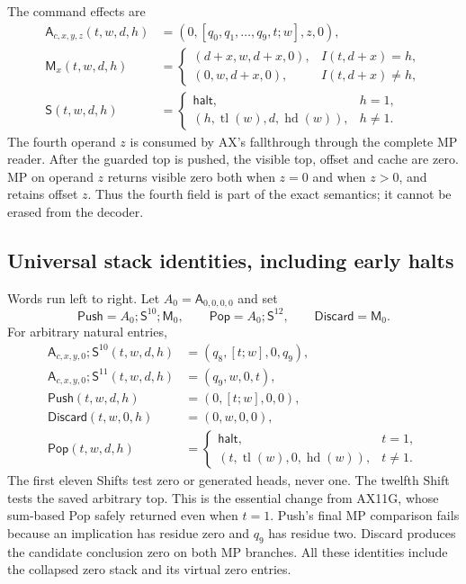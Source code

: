 The command effects are
\begin{align*}
 \mathsf A_{c,x,y,z}(t,w,d,h)&=(0,[q_0,q_1,\ldots,q_9,t;w],z,0),\\
 \mathsf M_x(t,w,d,h)&=
 \begin{cases}(d+x,w,d+x,0),&I(t,d+x)=h,\\
 (0,w,d+x,0),&I(t,d+x)\ne h,\end{cases}\\
 \mathsf S(t,w,d,h)&=
 \begin{cases}\mathsf{halt},&h=1,\\
 (h,\operatorname{tl}(w),d,\operatorname{hd}(w)),&h\ne1.
 \end{cases}
\end{align*}
The fourth operand $z$ is consumed by AX's fallthrough through the
complete MP reader. After the guarded top is pushed, the visible top,
offset and cache are zero. MP on operand $z$ returns visible zero both
when $z=0$ and when $z>0$, and retains offset $z$. Thus the fourth field
is part of the exact semantics; it cannot be erased from the decoder.

\subsection{Universal stack identities, including early halts}

Words run left to right. Let $A_0=\mathsf A_{0,0,0,0}$ and set
\[
 \mathsf{Push}=A_0;\mathsf S^{10};\mathsf M_0,
 \qquad \mathsf{Pop}=A_0;\mathsf S^{12},
 \qquad \mathsf{Discard}=\mathsf M_0.
\]
For arbitrary natural entries,
\begin{align*}
 \mathsf A_{c,x,y,0};\mathsf S^{10}(t,w,d,h)&=(q_8,[t;w],0,q_9),\\
 \mathsf A_{c,x,y,0};\mathsf S^{11}(t,w,d,h)&=(q_9,w,0,t),\\
 \mathsf{Push}(t,w,d,h)&=(0,[t;w],0,0),\\
 \mathsf{Discard}(t,w,0,h)&=(0,w,0,0),\\
 \mathsf{Pop}(t,w,d,h)&=
 \begin{cases}\mathsf{halt},&t=1,\\
 (t,\operatorname{tl}(w),0,\operatorname{hd}(w)),&t\ne1.
 \end{cases}
\end{align*}
The first eleven Shifts test zero or generated heads, never one.
The twelfth Shift tests the saved arbitrary top. This is the essential
change from AX11G, whose sum-based Pop safely returned even when $t=1$.
Push's final MP comparison fails because an implication has residue
zero and $q_9$ has residue two. Discard produces the candidate conclusion
zero on both MP branches. All these identities include the collapsed
zero stack and its virtual zero entries.

